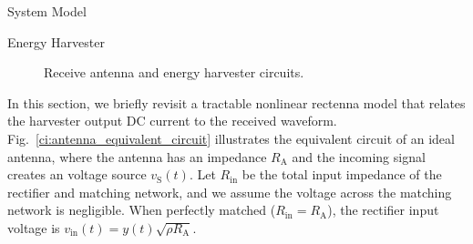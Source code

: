 \documentclass[journal]{IEEEtran}
\begin{document}
\begin{section}{System Model}
		\begin{subsection}{Energy Harvester}
			\begin{figure}[!t]
				\centering
				\caption{Receive antenna and energy harvester circuits.}
			\end{figure}

			In this section, we briefly revisit a tractable nonlinear rectenna model that relates the harvester output DC current to the received waveform. Fig.~\ref{ci:antenna_equivalent_circuit} illustrates the equivalent circuit of an ideal antenna, where the antenna has an impedance $R_{\mathrm{A}}$ and the incoming signal creates an voltage source $v_{\mathrm{S}}(t)$. Let $R_{\mathrm{in}}$ be the total input impedance of the rectifier and matching network, and we assume the voltage across the matching network is negligible. When perfectly matched ($R_{\mathrm{in}}=R_{\mathrm{A}}$), the rectifier input voltage is $v_{\mathrm{in}}(t)=y(t)\sqrt{\rho R_{\mathrm{A}}}$.


\end{subsection}
\end{section}
\end{document}
